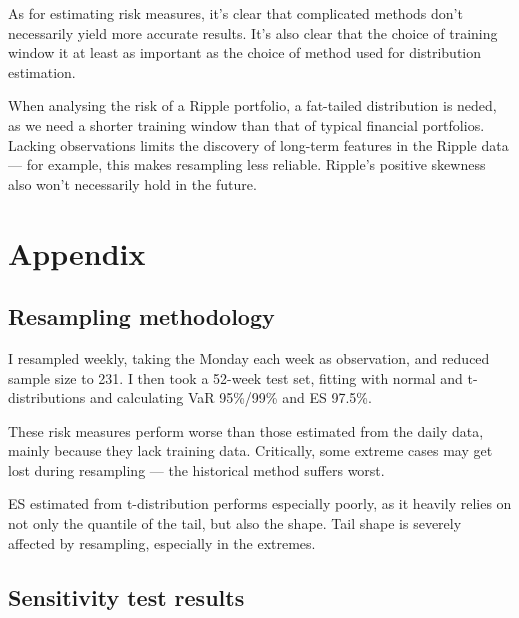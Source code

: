 \documentclass{article}
\newcommand{\ciapdf}[1]{\resizebox{\textwidth}{!}{\texttt{[image: \#1]}}}
\begin{document}
As for estimating risk measures, it's clear that complicated methods don't
necessarily yield more accurate results. It's also clear that the choice of
training window it at least as important as the choice of method used for
distribution estimation.

When analysing the risk of a Ripple portfolio, a fat-tailed distribution is
neded, as we need a shorter training window than that of typical financial
portfolios. Lacking observations limits the discovery of long-term features in
the Ripple data --- for example, this makes resampling less reliable. Ripple's
positive skewness also won't necessarily hold in the future.

\section*{Appendix}

\subsection*{Resampling methodology}

I resampled weekly, taking the Monday each week as observation, and reduced
sample size to 231. I then took a 52-week test set, fitting with normal and
t-distributions and calculating VaR 95\%/99\% and ES 97.5\%.

These risk measures perform worse than those estimated from the daily data,
mainly because they lack training data. Critically, some extreme cases may get
lost during resampling --- the historical method suffers worst.

ES estimated from t-distribution performs especially poorly, as it heavily
relies on not only the quantile of the tail, but also the shape. Tail shape is
severely affected by resampling, especially in the extremes.

\ciapdf{assignment_1/report_pic/RippleParaResample.pdf}
\ciapdf{assignment_1/report_pic/RippleParaAll.pdf}

\subsection*{Sensitivity test results}
\end{document}

